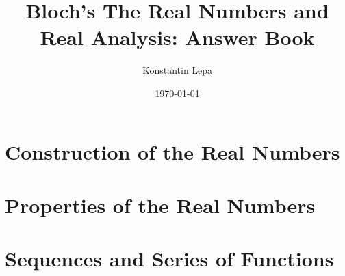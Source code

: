 \documentclass[reqno]{amsbook}
\title{Bloch's The Real Numbers and Real Analysis: Answer Book}
\author{Konstantin Lepa}
\date{\today}
\begin{document}
\begin{preview}

	\maketitle

	\Newpage
	\chapter{Construction of the Real Numbers}

	\Newpage
	

	\Newpage
	

	\Newpage
	

	\Newpage
	

	\Newpage
	

	\Newpage
	

	\Newpage
	


	\Newpage
	\chapter{Properties of the Real Numbers}

	\addtocounter{section}{1}

	\Newpage
	

	\Newpage
	

	\addtocounter{section}{1}

	\Newpage
	

	\addtocounter{section}{2}

	\Newpage
	


	\addtocounter{chapter}{7}
	\Newpage
	\chapter{Sequences and Series of Functions}

	\addtocounter{section}{3}

	\Newpage
	


	\Newpage
	\begin{thebibliography}{99}
	\end{thebibliography}

\end{preview}
\end{document}
